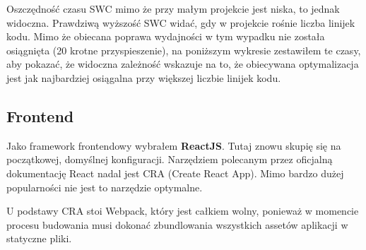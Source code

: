 \documentclass{article}
\begin{document}
Oszczędność czasu SWC mimo że przy małym projekcie jest niska, to jednak widoczna. Prawdziwą wyższość SWC widać, gdy w projekcie rośnie liczba linijek kodu. Mimo że obiecana poprawa wydajności w tym wypadku nie została osiągnięta (20 krotne przyspieszenie), na poniższym wykresie zestawiłem te czasy, aby pokazać, że widoczna zależność wskazuje na to, że obiecywana optymalizacja jest jak najbardziej osiągalna przy większej liczbie linijek kodu.

\begin{center}
\end{center} 

\subsection{Frontend}

Jako framework frontendowy wybrałem \textbf{ReactJS}. Tutaj znowu skupię się na początkowej, domyślnej konfiguracji. Narzędziem polecanym przez oficjalną dokumentację React nadal jest CRA (Create React App). Mimo bardzo dużej popularności nie jest to narzędzie optymalne.

U podstawy CRA stoi Webpack, który jest całkiem wolny, ponieważ w momencie procesu budowania musi dokonać zbundlowania wszystkich assetów aplikacji w statyczne pliki.
\end{document}
